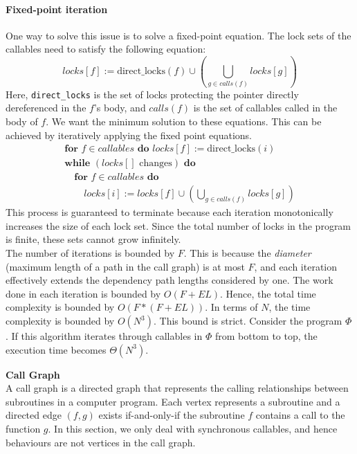 \documentclass[a4paper,12pt,fleqn]{article}
\begin{document}
\paragraph{Fixed-point iteration\\} \label{sec:fixed-point-iter}
One way to solve this issue is to solve a fixed-point equation. The lock sets of the callables need to satisfy the following equation:
$$ locks[f] := \text{direct\_locks}(f) \cup \left( \bigcup_{g \in calls(f)} locks[g] \right) $$
Here, \texttt{direct\_locks} is the set of locks protecting the pointer directly dereferenced in the $f$'s body, and $calls(f)$ is the set of callables called in the body of $f$. We want the minimum solution to these equations. This can be achieved by iteratively applying the fixed point equations.
$$
\begin{array}{l}
\textbf{for } f \in \textit{callables} \textbf{ do } locks[f] := \text{direct\_locks}(i) \\
\textbf{while } (locks[] \text{ changes}) \textbf{ do} \\
\quad \textbf{for } f \in \textit{callables} \textbf{ do} \\
\quad \quad locks[i] := locks[f] \cup \left( \bigcup_{g \in calls(f)} locks[g] \right)
\end{array}
$$
This process is guaranteed to terminate because each iteration monotonically increases the size of each lock set. Since the total number of locks in the program is finite, these sets cannot grow infinitely.\\

The number of iterations is bounded by $F$. This is because the \textit{diameter} (maximum length of a path in the call graph) is at most $F$, and each iteration effectively extends the dependency path lengths considered by one. The work done in each iteration is bounded by $O(F + EL)$. Hence, the total time complexity is bounded by $O(F * (F + EL))$. In terms of $N$, the time complexity is bounded by $O(N^3)$. This bound is strict. Consider the program $\Phi$. If this algorithm iterates through callables in $\Phi$ from bottom to top, the execution time becomes $\Theta(N^3)$.

\begin{notebox}
\textbf{Call Graph\\}
A call graph is a directed graph that represents the calling relationships between subroutines in a computer program. Each vertex represents a subroutine and a directed edge $(f, g)$ exists if-and-only-if the subroutine $f$ contains a call to the function $g$. In this section, we only deal with synchronous callables, and hence behaviours are not vertices in the call graph.
\end{notebox}
\end{document}
